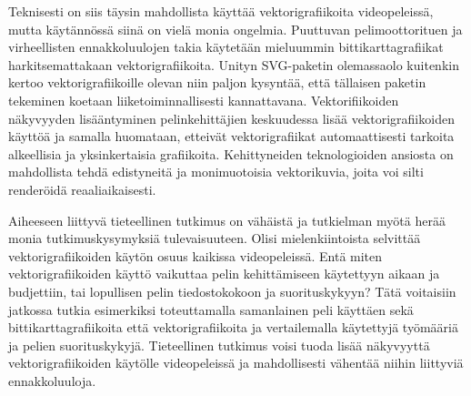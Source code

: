 \documentclass[utf8,bachelor]{gradu3}
\begin{document}
Teknisesti on siis täysin mahdollista käyttää vektorigrafiikoita videopeleissä, mutta käytännössä siinä on vielä monia ongelmia. Puuttuvan pelimoottorituen ja virheellisten ennakkoluulojen takia käytetään mieluummin bittikarttagrafiikat harkitsemattakaan vektorigrafiikoita. Unityn SVG-paketin olemassaolo kuitenkin kertoo vektorigrafiikoille olevan niin paljon kysyntää, että tällaisen paketin tekeminen koetaan liiketoiminnallisesti kannattavana. Vektorifiikoiden näkyvyyden lisääntyminen pelinkehittäjien keskuudessa lisää vektorigrafiikoiden käyttöä ja samalla huomataan, etteivät vektorigrafiikat automaattisesti tarkoita alkeellisia ja yksinkertaisia grafiikoita. Kehittyneiden teknologioiden ansiosta on mahdollista tehdä edistyneitä ja monimuotoisia vektorikuvia, joita voi silti renderöidä reaaliaikaisesti.

Aiheeseen liittyvä tieteellinen tutkimus on vähäistä ja tutkielman myötä herää monia tutkimuskysymyksiä tulevaisuuteen. Olisi mielenkiintoista selvittää vektorigrafiikoiden käytön osuus kaikissa videopeleissä. Entä miten vektorigrafiikoiden käyttö vaikuttaa pelin kehittämiseen käytettyyn aikaan ja budjettiin, tai lopullisen pelin tiedostokokoon ja suorituskykyyn? Tätä voitaisiin jatkossa tutkia esimerkiksi toteuttamalla samanlainen peli käyttäen sekä bittikarttagrafiikoita että vektorigrafiikoita ja vertailemalla käytettyjä työmääriä ja pelien suorituskykyjä. Tieteellinen tutkimus voisi tuoda lisää näkyvyyttä vektorigrafiikoiden käytölle videopeleissä ja mahdollisesti vähentää niihin liittyviä ennakkoluuloja.


\printbibliography
\end{document}
